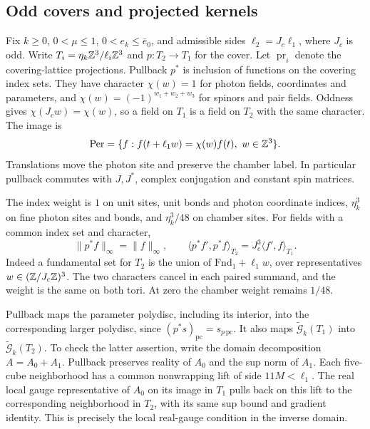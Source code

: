 \subsection{Odd covers and projected kernels}
\label{subsec:rgcov-projection}

Fix $k\ge0$, $0<\mu\le1$, $0<e_k\le\bar e_0$, and admissible
sides $\ell_2=J_c\ell_1$, where $J_c$ is odd.
Write $T_i=\eta_k\mathbb Z^3/\ell_i\mathbb Z^3$ and
$p:T_2\to T_1$ for the cover. Let
$\operatorname{pr}_i$ denote the covering-lattice projections.
Pullback $p^*$ is inclusion of functions on the covering
index sets. They have character
$\chi(w)=1$ for photon fields, coordinates and parameters,
and $\chi(w)=(-1)^{w_1+w_2+w_3}$ for spinors and pair
fields. Oddness gives
$\chi(J_cw)=\chi(w)$, so a field on $T_1$ is a field
on $T_2$ with the same character.
The image is
\[
 \mathrm{Per}=\{f:f(t+\ell_1w)=\chi(w)f(t),\ w\in\Z^3\}.
\]
Translations move the photon site and preserve the chamber
label. In particular pullback commutes with $J,J^*$,
complex conjugation and constant spin matrices.

The index weight is $1$ on unit sites, unit bonds and
photon coordinate indices, $\eta_k^3$ on fine photon
sites and bonds, and $\eta_k^3/48$ on chamber sites.
For fields with a common index set and character,
\begin{equation}\label{eq:rgcov-pullback-pairing}
 \|p^*f\|_\infty=\|f\|_\infty,\qquad
 \langle p^*f',p^*f\rangle_{T_2}
                                      =J_c^3\langle f',f\rangle_{T_1}.
\end{equation}
Indeed a fundamental set for $T_2$ is the union of
$\mathrm{Fnd}_1+\ell_1w$, over representatives
$w\in(\mathbb Z/J_c\mathbb Z)^3$. The two characters cancel in
each paired summand, and the weight is the same on both
tori. At zero the chamber weight remains $1/48$.

Pullback maps the parameter polydisc, including its interior,
into the corresponding larger polydisc, since
$(p^*s)_{\mathrm{pc}}=s_{p\,\mathrm{pc}}$.
It also maps
$\widetilde{\mathcal G}_k(T_1)$ into
$\widetilde{\mathcal G}_k(T_2)$.
To check the latter assertion, write the domain decomposition
$A=A_0+A_1$. Pullback preserves reality of $A_0$ and
the sup norm of $A_1$. Each five-cube neighborhood has
a common nonwrapping lift of side $11M<\ell_1$.
The real local gauge representative of $A_0$ on its
image in $T_1$ pulls back on this lift to the
corresponding neighborhood in $T_2$, with its same
sup bound and gradient identity. This is precisely
the local real-gauge condition in the inverse domain.


